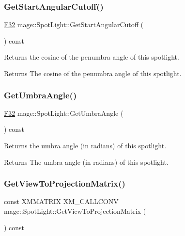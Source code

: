 \subsubsection{\texorpdfstring{Get\+Start\+Angular\+Cutoff()}{GetStartAngularCutoff()}}
{\footnotesize\ttfamily \hyperlink{namespacemage_aa97e833b45f06d60a0a9c4fc22ae02c0}{F32} mage\+::\+Spot\+Light\+::\+Get\+Start\+Angular\+Cutoff (\begin{DoxyParamCaption}{ }\end{DoxyParamCaption}) const\hspace{0.3cm}{\ttfamily [noexcept]}}

Returns the cosine of the penumbra angle of this spotlight.

\begin{DoxyReturn}{Returns}
The cosine of the penumbra angle of this spotlight. 
\end{DoxyReturn}
\hypertarget{classmage_1_1_spot_light_ae29059615f77f1afe414dc826b2d2af8}{}\label{classmage_1_1_spot_light_ae29059615f77f1afe414dc826b2d2af8} 
\subsubsection{\texorpdfstring{Get\+Umbra\+Angle()}{GetUmbraAngle()}}
{\footnotesize\ttfamily \hyperlink{namespacemage_aa97e833b45f06d60a0a9c4fc22ae02c0}{F32} mage\+::\+Spot\+Light\+::\+Get\+Umbra\+Angle (\begin{DoxyParamCaption}{ }\end{DoxyParamCaption}) const\hspace{0.3cm}{\ttfamily [noexcept]}}

Returns the umbra angle (in radians) of this spotlight.

\begin{DoxyReturn}{Returns}
The umbra angle (in radians) of this spotlight. 
\end{DoxyReturn}
\hypertarget{classmage_1_1_spot_light_ae436e8fee37639e9218cc7f3822cebbd}{}\label{classmage_1_1_spot_light_ae436e8fee37639e9218cc7f3822cebbd} 
\subsubsection{\texorpdfstring{Get\+View\+To\+Projection\+Matrix()}{GetViewToProjectionMatrix()}}
{\footnotesize\ttfamily const X\+M\+M\+A\+T\+R\+IX X\+M\+\_\+\+C\+A\+L\+L\+C\+O\+NV mage\+::\+Spot\+Light\+::\+Get\+View\+To\+Projection\+Matrix (\begin{DoxyParamCaption}{ }\end{DoxyParamCaption}) const\hspace{0.3cm}{\ttfamily [noexcept]}}

